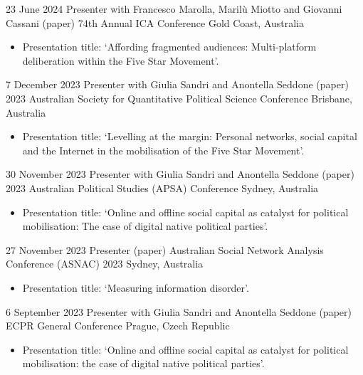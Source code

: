 \documentclass[12pt,a4paper,sans]{moderncv}
\begin{document}
\cventry 
{23 June 2024}
{Presenter with Francesco Marolla, Marilù Miotto and Giovanni Cassani (paper)}
{74th Annual ICA Conference}
{Gold Coast, Australia}
{}
      {
      \begin{itemize} %
        \item {Presentation title: `Affording fragmented audiences: Multi-platform deliberation within the Five Star Movement'. \href{https://www.icahdq.org/mpage/ICA24-program}{\faLink} \href{https://fraba.github.io/presentation/2024-ICA}{\faLink}}
      \end{itemize}
    }

\cventry 
{7 December 2023}
{Presenter with Giulia Sandri and Anontella Seddone (paper)}
{2023 Australian Society for Quantitative Political Science Conference}
{Brisbane, Australia}
{}
      {
      \begin{itemize} %
        \item {Presentation title: `Levelling at the margin: Personal networks, social capital and the Internet in the mobilisation of the Five Star Movement'. \href{https://asqps.org.au/2023-annual-conference-brisbane/}{\faLink} \href{https://fraba.github.io/presentation/2023-ASQPS/}{\faLink}}
      \end{itemize}
    }

\cventry 
{30 November 2023}
{Presenter with Giulia Sandri and Anontella Seddone (paper)}
{2023 Australian Political Studies (APSA) Conference}
{Sydney, Australia}
{}
      {
      \begin{itemize} %
        \item {Presentation title: `Online and offline social capital as catalyst for political mobilisation: The case of digital native political parties'. \href{https://auspsa.org.au/apsa2023/}{\faLink} \href{https://fraba.github.io/presentation/2023-APSA/}{\faLink}}
      \end{itemize}
    }


\cventry 
{27 November 2023}
{Presenter (paper)}
{Australian Social Network Analysis Conference (ASNAC) 2023}
{Sydney, Australia}
{}
      {
      \begin{itemize} %
        \item {Presentation title: `Measuring information disorder'. \href{https://www.ansna.org.au/asnac-2023}{\faLink} \href{https://fraba.github.io/presentation/2023-ASNAC/}{\faLink}}
      \end{itemize}
    }

\cventry 
{6 September 2023}
{Presenter with Giulia Sandri and Anontella Seddone (paper)}
{ECPR General Conference}
{Prague, Czech Republic}
{}
      {
      \begin{itemize} %
        \item {Presentation title: `Online and offline social capital as catalyst for political mobilisation: the case of digital native political parties'. \href{https://ecpr.eu/Events/214}{\faLink} \href{https://ecpr.eu/Events/Event/PaperDetails/68582}{\faLink} \href{https://fraba.github.io/presentation/2023-ECPR}{\faLink}}
      \end{itemize}
    }
\end{document}

